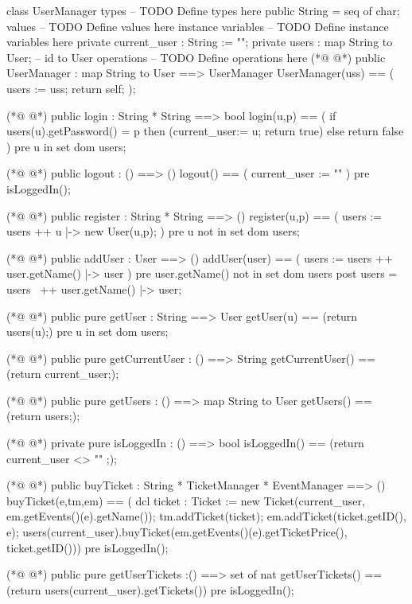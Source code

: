 \begin{vdmpp}[breaklines=true]
class UserManager
types
-- TODO Define types here
 public String = seq of char;
values
-- TODO Define values here
instance variables
-- TODO Define instance variables here
  private current_user : String := "";
 private users : map String to User; -- id to User
operations
-- TODO Define operations here
(*@
\label{UserManager:13}
@*)
 public UserManager : map String to User ==> UserManager
 UserManager(uss) == (
  users := uss;
  return self;
 );
 
(*@
\label{login:19}
@*)
 public login : String * String ==> bool
 login(u,p) == (
  if users(u).getPassword() = p
  then (current_user:= u; return true)
  else return false
 )
 pre u in set dom users;
 
(*@
\label{logout:27}
@*)
 public logout : () ==> ()
 logout() == (
  current_user := ""
 )
 pre isLoggedIn();
 
(*@
\label{register:33}
@*)
 public register : String * String ==> ()
 register(u,p) == (
  users := users ++ {u |-> new User(u,p)};
 )
 pre u not in set dom users;
 
(*@
\label{addUser:39}
@*)
 public addUser : User ==> ()
 addUser(user) == (
  users := users ++ {user.getName() |-> user}
 )
 pre user.getName() not in set dom users
 post users = users~ ++ {user.getName() |-> user};
 
(*@
\label{getUser:46}
@*)
 public pure getUser : String ==> User
 getUser(u) == (return users(u);)
 pre u in set dom users;

(*@
\label{getCurrentUser:50}
@*)
 public pure getCurrentUser : () ==> String
 getCurrentUser() == (return current_user;);
 
(*@
\label{getUsers:53}
@*)
 public pure getUsers : () ==> map String to User
 getUsers() == (return users;);
 
(*@
\label{isLoggedIn:56}
@*)
 private pure isLoggedIn : () ==> bool
 isLoggedIn() == (return current_user <> "" ;);
 
(*@
\label{buyTicket:59}
@*)
 public buyTicket : String * TicketManager * EventManager ==> ()
 buyTicket(e,tm,em) == (
 dcl ticket : Ticket := new Ticket(current_user, em.getEvents()(e).getName());
 tm.addTicket(ticket);
 em.addTicket(ticket.getID(), e);
 users(current_user).buyTicket(em.getEvents()(e).getTicketPrice(), ticket.getID()))
 pre isLoggedIn();
 
(*@
\label{getUserTickets:67}
@*)
 public pure getUserTickets :() ==> set of nat
 getUserTickets() == (return users(current_user).getTickets())
 pre isLoggedIn();
 

\end{vdmpp}
